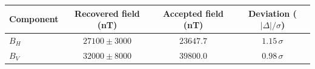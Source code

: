 \begin{tabular}{lccc}
  \hline
  Component & Recovered field (nT) & Accepted field (nT) & Deviation ($|\Delta|/\sigma$) \\
  \hline
  $B_H$ & $27100 \pm 3000$ & $23647.7$ & $1.15\,\sigma$ \\
  $B_V$ & $32000 \pm 8000$ & $39800.0$ & $0.98\,\sigma$ \\
  \hline
\end{tabular}